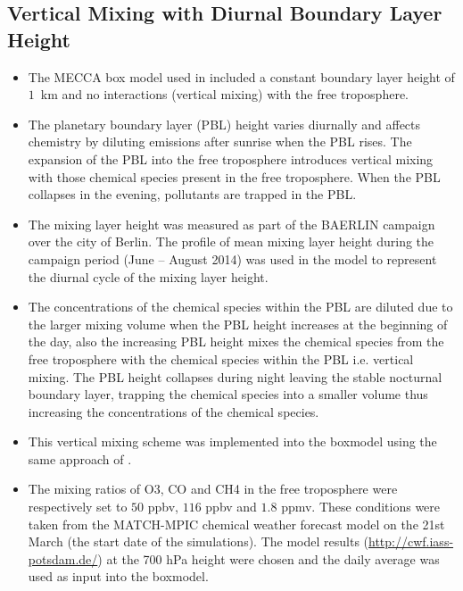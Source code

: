 \subsection{Vertical Mixing with Diurnal Boundary Layer Height} \label{ss:vertical_mixing}
\begin{itemize}
    \item The MECCA box model used in \citet{Coates:2015} included a constant boundary layer height of $1$~km and no interactions (vertical mixing) with the free troposphere.
    \item The planetary boundary layer (PBL) height varies diurnally and affects chemistry by diluting emissions after sunrise when the PBL rises. The expansion of the PBL into the free troposphere introduces vertical mixing with those chemical species present in the free troposphere. When the PBL collapses in the evening, pollutants are trapped in the PBL.
    \item The mixing layer height was measured as part of the BAERLIN campaign  over the city of Berlin. The profile of mean mixing layer height during the campaign period (June -- August 2014) was used in the model to represent the diurnal cycle of the mixing layer height.
    \item The concentrations of the chemical species within the PBL are diluted due to the larger mixing volume when the PBL height increases at the beginning of the day, also the increasing PBL height mixes the chemical species from the free troposphere with the chemical species within the PBL i.e. vertical mixing. The PBL height collapses during night leaving the stable nocturnal boundary layer, trapping the chemical species into a smaller volume thus increasing the concentrations of the chemical species.
    \item This vertical mixing scheme was implemented into the boxmodel using the same approach of \citet{Lourens:2012}.
    \item The mixing ratios of O3, CO and CH4 in the free troposphere were respectively set to $50$ ppbv, $116$ ppbv and $1.8$ ppmv. These conditions were taken from the MATCH-MPIC chemical weather forecast model on the 21st March (the start date of the simulations). The model results (\url{http://cwf.iass-potsdam.de/}) at the 700 hPa height were chosen and the daily average was used as input into the boxmodel. 
\end{itemize}
